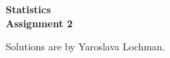 \documentclass[12pt,a4]{article}
\newtheorem{problem}{Problem}
\newcommand{\abs}[1]{\left | #1 \right |}
\begin{document}
	
\begin{center}
	\Large\bf{Statistics\\Assignment 2}
\end{center}
Solutions are by Yaroslava Lochman.

\addtocounter{problem}{4}

\end{document}
